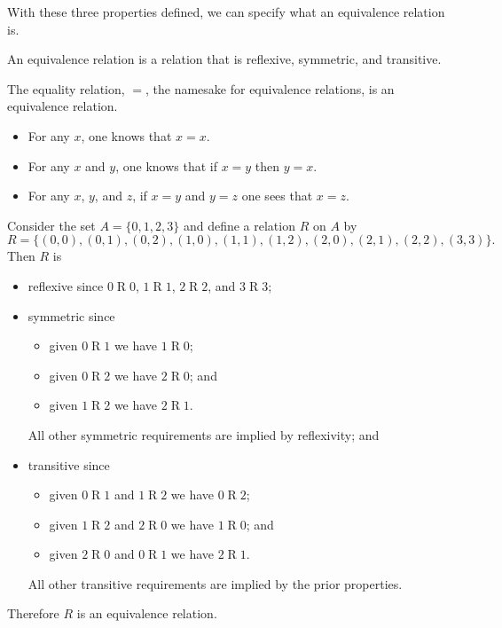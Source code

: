 With these three properties defined, we can specify what an equivalence relation is.
\begin{definition}
    An equivalence relation is a relation that is reflexive, symmetric, and transitive.
\end{definition}

\begin{example}
    The equality relation, $=$, the namesake for equivalence relations, is an equivalence relation.
    \begin{itemize}
        \item For any $x$, one knows that $x = x$.
        \item For any $x$ and $y$, one knows that if $x = y$ then $y = x$.
        \item For any $x$, $y$, and $z$, if $x = y$ and $y = z$ one sees that $x = z$.
    \end{itemize}
\end{example}

\begin{example}
    Consider the set $A = \{0, 1, 2, 3\}$ and define a relation $R$ on $A$ by
    \[
        R = \{(0, 0), (0, 1), (0, 2), (1, 0), (1, 1), (1, 2), (2, 0), (2, 1), (2, 2), (3, 3)\}.
    \]
    Then $R$ is
    \begin{itemize}
        \item reflexive since $0\mathrel{R}0$, $1\mathrel{R}1$, $2\mathrel{R}2$, and $3\mathrel{R}3$;
        \item symmetric since
        \begin{itemize}
            \item given $0\mathrel{R}1$ we have $1\mathrel{R}0$;
            \item given $0\mathrel{R}2$ we have $2\mathrel{R}0$; and
            \item given $1\mathrel{R}2$ we have $2\mathrel{R}1$.
        \end{itemize}
        All other symmetric requirements are implied by reflexivity; and
        \item transitive since
        \begin{itemize}
            \item given $0\mathrel{R}1$ and $1\mathrel{R}2$ we have $0\mathrel{R}2$;
            \item given $1\mathrel{R}2$ and $2\mathrel{R}0$ we have $1\mathrel{R}0$; and
            \item given $2\mathrel{R}0$ and $0\mathrel{R}1$ we have $2\mathrel{R}1$.
        \end{itemize}
        All other transitive requirements are implied by the prior properties.
    \end{itemize}
    Therefore $R$ is an equivalence relation.
\end{example}

